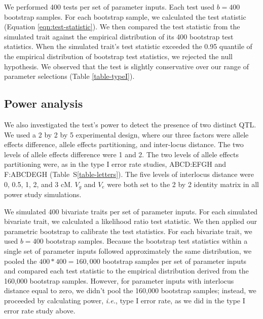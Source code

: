 \documentclass[12pt,twoside, lineno]{gsajnl}
\begin{document}
We performed 400 tests per set of parameter inputs. Each test used $b
= 400$ bootstrap samples. For each bootstrap sample, we calculated the
test statistic (Equation \ref{eqn:test-statistic}). We then compared
the test statistic from the simulated trait against the empirical
distribution of its 400 bootstrap test statistics. When the simulated
trait's test statistic exceeded the 0.95 quantile of the empirical
distribution of bootstrap test statistics, we rejected the null
hypothesis. We observed that the test is slightly conservative over
our range of parameter selections (Table \ref{table-typeI}).


\subsection{Power analysis}

We also investigated the test's power to detect the presence of two
distinct QTL. We used a 2 by 2 by 5 experimental design, where our
three factors were allele effects difference, allele effects
partitioning, and inter-locus distance. The two levels of allele
effects difference were 1 and 2. The two levels of allele effects
partitioning were, as in the type I error rate studies, ABCD:EFGH and
F:ABCDEGH (Table~S\ref{table-letters}). The five levels of interlocus
distance were 0, 0.5, 1, 2, and 3 cM. $V_g$ and $V_e$ were both set to
the 2 by 2 identity matrix in all power study simulations.

We simulated 400 bivariate traits per set of parameter inputs. For
each simulated bivariate trait, we calculated a likelihood ratio test
statistic. We then applied our parametric bootstrap to calibrate the
test statistics. For each bivariate trait, we used $b = 400$ bootstrap
samples. Because the bootstrap test statistics within a single set of
parameter inputs followed approximately the same distribution, we
pooled the $400 * 400 = 160,000$ bootstrap samples per set of
parameter inputs and compared each test statistic to the empirical
distribution derived from the 160,000 bootstrap samples. However, for
parameter inputs with interlocus distance equal to zero, we didn't
pool the 160,000 bootstrap samples; instead, we proceeded by
calculating power, \textit{i.e.}, type I error rate, as we did in the
type I error rate study above.
\end{document}
